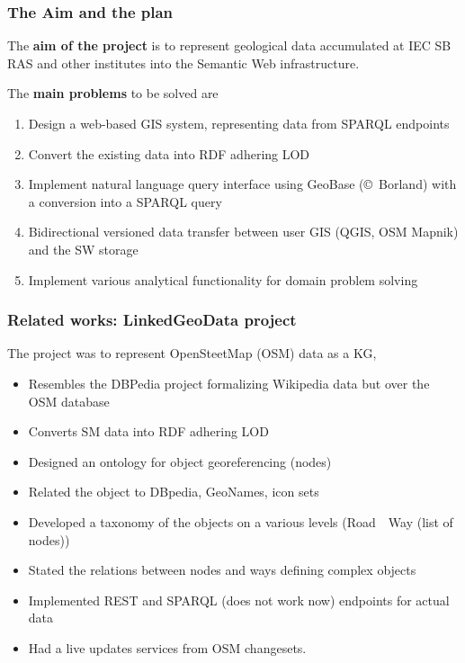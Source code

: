 \documentclass[10pt]{beamer}
\begin{document}
\begin{frame}
  \frametitle{The Aim and the plan}
  The \textbf{aim of the project} is to represent geological data accumulated at IEC SB RAS and other institutes into the Semantic Web infrastructure.

  The \textbf{main problems} to be solved are
  \begin{enumerate}
  \item Design a web-based GIS system, representing data from SPARQL endpoints
  \item Convert the existing data into RDF adhering LOD
  \item Implement natural language query interface using GeoBase (\copyright~Borland) with a conversion into a SPARQL query
  \item Bidirectional versioned data transfer between user GIS (QGIS, OSM Mapnik) and the SW storage %
  \item Implement various analytical functionality for domain problem solving
  \end{enumerate}
\end{frame}


\begin{frame}
  \frametitle{Related works: \textbf{LinkedGeoData} project}
  The project \cite{lgd} was to represent OpenSteetMap (OSM) data as a KG,
  \begin{itemize}
  \item Resembles the DBPedia project formalizing Wikipedia data but over the OSM database
  \item Converts SM data into RDF adhering LOD
  \item Designed an ontology for object georeferencing (nodes)
  \item Related the object to DBpedia, GeoNames, icon sets
  \item Developed a taxonomy of the objects on a various levels (Road~\to~Way (list of nodes)) %
  \item Stated the relations between nodes and ways defining complex objects
  \item Implemented REST and SPARQL (does not work now) endpoints for actual data
  \item Had a live updates services from OSM changesets.
  \end{itemize}
\end{frame}
\end{document}
